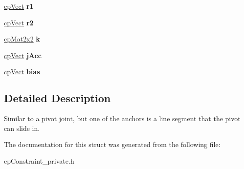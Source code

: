 \begin{DoxyCompactItemize}
\item 
\hypertarget{structcp_groove_joint_afe9dd098205f571cc637f89c4e952dc4}{}\hyperlink{structcp_vect}{cp\+Vect} {\bfseries r1}\label{structcp_groove_joint_afe9dd098205f571cc637f89c4e952dc4}

\item 
\hypertarget{structcp_groove_joint_ad0dcb895562c9f33f0e13a27fb079800}{}\hyperlink{structcp_vect}{cp\+Vect} {\bfseries r2}\label{structcp_groove_joint_ad0dcb895562c9f33f0e13a27fb079800}

\item 
\hypertarget{structcp_groove_joint_abf71a39fc1198bc6cc62d11ea5f68af4}{}\hyperlink{structcp_mat2x2}{cp\+Mat2x2} {\bfseries k}\label{structcp_groove_joint_abf71a39fc1198bc6cc62d11ea5f68af4}

\item 
\hypertarget{structcp_groove_joint_a208102ecfa8a5096311acd126762f82c}{}\hyperlink{structcp_vect}{cp\+Vect} {\bfseries j\+Acc}\label{structcp_groove_joint_a208102ecfa8a5096311acd126762f82c}

\item 
\hypertarget{structcp_groove_joint_a33a40d28da62cc7bbd74fc3bfa68f0bf}{}\hyperlink{structcp_vect}{cp\+Vect} {\bfseries bias}\label{structcp_groove_joint_a33a40d28da62cc7bbd74fc3bfa68f0bf}

\end{DoxyCompactItemize}


\subsection{Detailed Description}
Similar to a pivot joint, but one of the anchors is a line segment that the pivot can slide in. 

The documentation for this struct was generated from the following file\+:\begin{DoxyCompactItemize}
\item 
cp\+Constraint\+\_\+private.\+h\end{DoxyCompactItemize}

